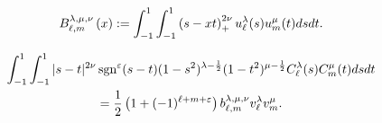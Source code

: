 \documentclass[a4paper]{article}
\begin{document}
\begin{theorem}
  \label{main-thm}
  \begin{equation*}
	B^{\lambda,\mu,\nu}_{\ell,m}\left( x \right):=
     \displaystyle
     \int_{- 1}^1 \displaystyle\int_{- 1}^1 \left(  s- xt  \right)_+^{2 \nu} u_{\ell}^{\lambda} (s)
     u_m^{\mu} (t) d s d t.
  \end{equation*}
\end{theorem}
\begin{proposition}
  \label{cor:1}
  \begin{multline}
    \displaystyle\int_{- 1}^1 \displaystyle\int_{- 1}^1 | s - t |^{2 \nu}\operatorname{sgn}^\varepsilon(s- t) (1 - s^2)^{\lambda -
    \frac{1}{2}} (1 - t^2)^{\mu - \frac{1}{2}} C_{\ell}^{\lambda} (s)
    C_m^{\mu} (t) d s d t   \\=\frac{1}{2}\left( 1+(-1)^{\ell+m+\varepsilon} \right)b^{\lambda,\mu,\nu}_{\ell,m} v_\ell^\lambda v^\mu_m.
	\label{eqn:cor:1}
  \end{multline}
\end{proposition}















\end{document}
